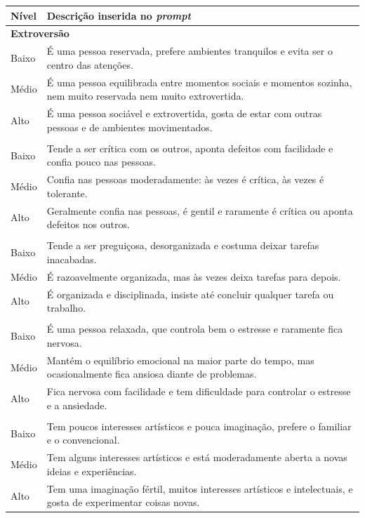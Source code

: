 \begin{quadro}[htbp]
    \caption{Descrições usadas para induzir cada nível de cada traço}
    \label{quadro:perfis-nivel}
    \centering
    \small
    \begin{tabular}{lp{12cm}}
        \toprule
        Nível & Descrição inserida no \textit{prompt} \\
        \midrule
        \multicolumn{2}{l}{\textbf{Extroversão}} \\
        Baixo & É uma pessoa reservada, prefere ambientes tranquilos e evita ser o centro das atenções. \\
        Médio & É uma pessoa equilibrada entre momentos sociais e momentos sozinha, nem muito reservada nem muito extrovertida. \\
        Alto & É uma pessoa sociável e extrovertida, gosta de estar com outras pessoas e de ambientes movimentados. \\
        \addlinespace
        \multicolumn{2}{l}{\textbf{Amabilidade}} \\
        Baixo & Tende a ser crítica com os outros, aponta defeitos com facilidade e confia pouco nas pessoas. \\
        Médio & Confia nas pessoas moderadamente: às vezes é crítica, às vezes é tolerante. \\
        Alto & Geralmente confia nas pessoas, é gentil e raramente é crítica ou aponta defeitos nos outros. \\
        \addlinespace
        \multicolumn{2}{l}{\textbf{Consciência}} \\
        Baixo & Tende a ser preguiçosa, desorganizada e costuma deixar tarefas inacabadas. \\
        Médio & É razoavelmente organizada, mas às vezes deixa tarefas para depois. \\
        Alto & É organizada e disciplinada, insiste até concluir qualquer tarefa ou trabalho. \\
        \addlinespace
        \multicolumn{2}{l}{\textbf{Neuroticismo}} \\
        Baixo & É uma pessoa relaxada, que controla bem o estresse e raramente fica nervosa. \\
        Médio & Mantém o equilíbrio emocional na maior parte do tempo, mas ocasionalmente fica ansiosa diante de problemas. \\
        Alto & Fica nervosa com facilidade e tem dificuldade para controlar o estresse e a ansiedade. \\
        \addlinespace
        \multicolumn{2}{l}{\textbf{Abertura à Experiência}} \\
        Baixo & Tem poucos interesses artísticos e pouca imaginação, prefere o familiar e o convencional. \\
        Médio & Tem alguns interesses artísticos e está moderadamente aberta a novas ideias e experiências. \\
        Alto & Tem uma imaginação fértil, muitos interesses artísticos e intelectuais, e gosta de experimentar coisas novas. \\
        \bottomrule
    \end{tabular}
\end{quadro}

